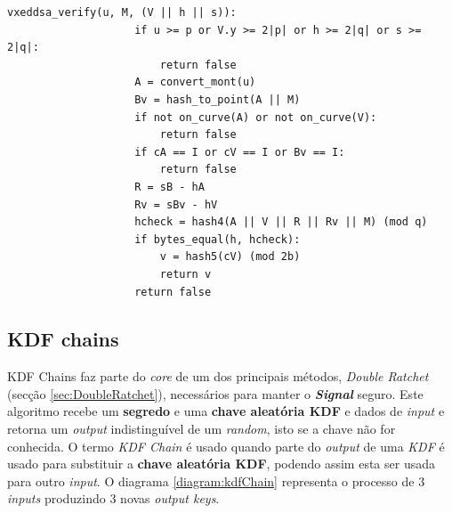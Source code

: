 \begin{itemize}
\begin{itemize}
\begin{itemize}
            \begin{lstlisting}[caption=Validação de assinatura de um documento,captionpos=b, label={vxeddsa_verify}]
                vxeddsa_verify(u, M, (V || h || s)):
                    if u >= p or V.y >= 2|p| or h >= 2|q| or s >= 2|q|:
                        return false
                    A = convert_mont(u)
                    Bv = hash_to_point(A || M)
                    if not on_curve(A) or not on_curve(V):
                        return false
                    if cA == I or cV == I or Bv == I:
                        return false
                    R = sB - hA
                    Rv = sBv - hV
                    hcheck = hash4(A || V || R || Rv || M) (mod q)
                    if bytes_equal(h, hcheck):
                        v = hash5(cV) (mod 2b)
                        return v
                    return false
            \end{lstlisting}
        \end{itemize}
    \end{itemize}
\end{itemize}

\subsection{KDF chains}\label{sec:KDF}
KDF Chains faz parte do \emph{core} de um dos principais métodos, \emph{Double Ratchet} (secção \ref{sec:DoubleRatchet}), necessários para manter o \textbf{\textit{Signal}} seguro.
Este algoritmo recebe um \textbf{segredo} e uma \textbf{chave aleatória KDF} e dados de \emph{input} e retorna um \emph{output} indistinguível de um \emph{random}, isto se a chave não for conhecida.
O termo \emph{KDF Chain} é usado quando parte do \emph{output} de uma \emph{KDF} é usado para substituir a \textbf{chave aleatória KDF}, podendo assim esta ser usada para outro \emph{input}. O diagrama \ref{diagram:kdfChain} representa o processo de 3 \emph{inputs} produzindo 3 novas \emph{output keys}.


